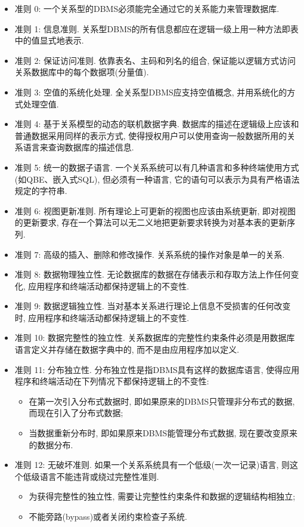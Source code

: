 \begin{itemize}
    \item 准则 0: 一个关系型的DBMS必须能完全通过它的关系能力来管理数据库.
    \item 准则 1: 信息准则. 关系型DBMS的所有信息都应在逻辑一级上用一种方法即表中的值显式地表示.
    \item 准则 2: 保证访问准则. 依靠表名、主码和列名的组合, 保证能以逻辑方式访问关系数据库中的每个数据项(分量值).
    \item 准则 3: 空值的系统化处理. 全关系型DBMS应支持空值概念, 并用系统化的方式处理空值.
    \item 准则 4: 基于关系模型的动态的联机数据字典. 数据库的描述在逻辑级上应该和普通数据采用同样的表示方式, 使得授权用户可以使用查询一般数据所用的关系语言来查询数据库的描述信息.
    \item 准则 5: 统一的数据子语言. 一个关系系统可以有几种语言和多种终端使用方式(如QBE、嵌入式SQL), 但必须有一种语言, 它的语句可以表示为具有严格语法规定的字符串.
    \item 准则 6: 视图更新准则.  所有理论上可更新的视图也应该由系统更新, 即对视图的更新要求, 存在一个算法可以无二义地把更新要求转换为对基本表的更新序列.
    \item 准则 7: 高级的插入、删除和修改操作. 关系系统的操作对象是单一的关系.
    \item 准则 8: 数据物理独立性. 无论数据库的数据在存储表示和存取方法上作任何变化, 应用程序和终端活动都保持逻辑上的不变性.
    \item 准则 9: 数据逻辑独立性. 当对基本关系进行理论上信息不受损害的任何改变时, 应用程序和终端活动都保持逻辑上的不变性.
    \item 准则 10: 数据完整性的独立性. 关系数据库的完整性约束条件必须是用数据库语言定义并存储在数据字典中的, 而不是由应用程序加以定义.
    \item 准则 11: 分布独立性. 分布独立性是指DBMS具有这样的数据库语言, 使得应用程序和终端活动在下列情况下都保持逻辑上的不变性:
    \begin{itemize}
        \item 在第一次引入分布式数据时, 即如果原来的DBMS只管理非分布式的数据, 而现在引入了分布式数据;
        \item 当数据重新分布时, 即如果原来DBMS能管理分布式数据, 现在要改变原来的数据分布.
    \end{itemize}
    \item 准则 12: 无破坏准则. 如果一个关系系统具有一个低级(一次一记录)语言, 则这个低级语言不能违背或绕过完整性准则.
    \begin{itemize}
        \item 为获得完整性的独立性, 需要让完整性约束条件和数据的逻辑结构相独立;
        \item 不能旁路(bypass)或者关闭约束检查子系统.
    \end{itemize}
\end{itemize}
